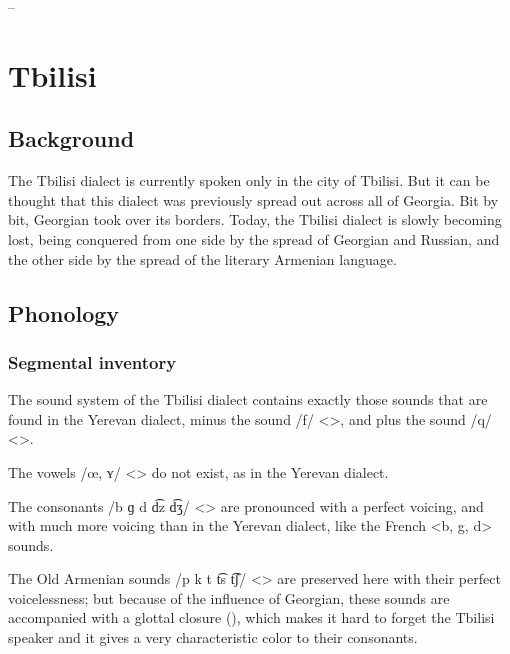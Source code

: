 – 





\chapter{Tbilisi}\label{chapter:Tbilisi}





\section{Background}

\begin{adjarianpage}\label{page:52}\end{adjarianpage}%

The Tbilisi dialect is currently spoken only in the city of Tbilisi. But it can be thought that this dialect was previously spread out across all of Georgia. Bit by bit, Georgian took over its borders. Today, the Tbilisi dialect is slowly becoming lost, being conquered from one side by the spread of Georgian and Russian, and the other side by the spread of the literary Armenian language. 

\section{Phonology}
\subsection{Segmental inventory}

The sound system of the Tbilisi dialect contains exactly those sounds that are found in the Yerevan dialect, minus the sound /f/ <>, and plus the sound /q/ <>. 

The vowels /œ, ʏ/ <> do not exist, as in the Yerevan dialect. 

The consonants /b ɡ d d͡z d͡ʒ/ <> are pronounced with a perfect voicing, and with much more voicing than in the Yerevan dialect, like the French <b, g, d> sounds. 

The Old Armenian sounds /p k t t͡s t͡ʃ/ <> are preserved here with their perfect voicelessness; but because of the influence of Georgian, these sounds are accompanied with a glottal closure (), which makes it hard to forget the Tbilisi speaker and it gives a very characteristic color to their consonants. 


